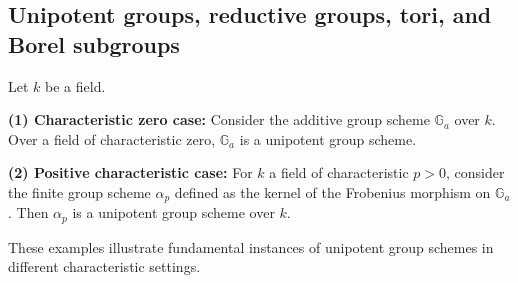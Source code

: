 













\subsection{Unipotent groups, reductive groups, tori, and Borel subgroups}









\begin{example}
    Let $k$ be a field.

    \textbf{(1) Characteristic zero case:} Consider the additive group scheme $\mathbb{G}_a$ over $k$. Over a field of characteristic zero, $\mathbb{G}_a$ is a unipotent group scheme.

    \textbf{(2) Positive characteristic case:} For $k$ a field of characteristic $p > 0$, consider the finite group scheme $\alpha_p$ defined as the kernel of the Frobenius morphism on $\mathbb{G}_a$. Then $\alpha_p$ is a unipotent group scheme over $k$.

    These examples illustrate fundamental instances of unipotent group schemes in different characteristic settings.
\end{example}





